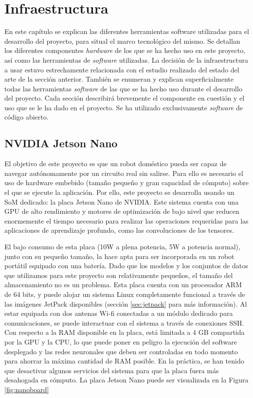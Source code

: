 \chapter{Infraestructura}

En este capítulo se explican las diferentes herramientas software utilizadas para el desarrollo del proyecto, para situal el marco tecnológico del mismo. Se detallan los diferentes componentes \textit{hardware} de los que se ha hecho uso en este proyecto, así como las herramientas de \textit{software} utilizadas. La decisión de la infraestructura a usar estuvo estrechamente relacionada con el estudio realizado del estado del arte de la sección anterior. También se enumeran y explican superficialmente todas las herramientas \textit{software} de las que se ha hecho uso durante el desarrollo del proyecto. Cada sección describirá brevemente el componente en cuestión y el uso que se le ha dado en el proyecto. Se ha utilizado exclusivamente \textit{software} de código abierto.

\section{NVIDIA Jetson Nano}

El objetivo de este proyecto es que un robot doméstico pueda ser capaz de navegar autónomamente por un circuito real sin salirse. Para ello es necesario el uso de hardware embebido (tamaño pequeño y gran capacidad de cómputo) sobre el que se ejecute la aplicación. Por ello, este proyecto se desarrolla usando un SoM dedicado: la placa Jetson Nano de NVIDIA. Este sistema cuenta con una GPU de alto rendimiento y motores de optimización de bajo nivel que reducen enormemente el tiempo necesario para realizar las operaciones requeridas para las aplicaciones de aprendizaje profundo, como las convoluciones de los tensores. 

El bajo consumo de esta placa (10W a plena potencia, 5W a potencia normal), junto con su pequeño tamaño, la hace apta para ser incorporada en un robot portátil equipado con una batería. 
Dado que los modelos y los conjuntos de datos que utilizamos para este proyecto son relativamente pequeños, el tamaño del almacenamiento no es un problema. Esta placa cuenta con un procesador ARM de 64 bits, y puede alojar un sistema Linux completamente funcional a través de las imágenes JetPack disponibles (sección \ref{sec:jetpack} para más información). Al estar equipada con dos antenas Wi-fi conectadas a un módulo dedicado para comunicaciones, se puede interactuar con el sistema a través de conexiones SSH. Con respecto a la RAM disponible en la placa, está limitada a 4 GB compartida por la GPU y la CPU, lo que puede poner en peligro la ejecución del software desplegado y las redes neuronales que deben ser controladas en todo momento para ahorrar la máxima cantidad de RAM posible. En la práctica, se han tenido que desactivar algunos servicios del sistema para que la placa fuera más desahogada en cómputo. La placa Jetson Nano puede ser visualizada en la Figura \ref{fig:nanoboard}


